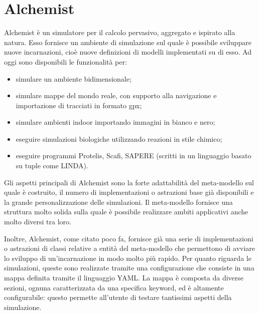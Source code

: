 \section{Alchemist}
Alchemist è un simulatore per il calcolo pervasivo, aggregato e ispirato alla natura. Esso fornisce un ambiente di simulazione sul quale è possibile sviluppare nuove incarnazioni, cioè nuove definizioni di modelli implementati su di esso. Ad oggi sono disponibili le funzionalità per:
\begin{itemize}
\item simulare un ambiente bidimensionale;
\item simulare mappe del mondo reale, con supporto alla navigazione e importazione di tracciati in formato gpx;
\item simulare ambienti indoor importando immagini in bianco e nero;
\item eseguire simulazioni biologiche utilizzando reazioni in stile chimico;
\item eseguire programmi Protelis, Scafi, SAPERE (scritti in un linguaggio basato su tuple come LINDA).
\end{itemize}

Gli aspetti principali di Alchemist sono la forte adattabilità del meta-modello sul quale è costruito, il numero di implementazioni o astrazioni base già disponibili e la grande personalizzazione delle simulazioni.
Il meta-modello fornisce una struttura molto solida sulla quale è possibile realizzare ambiti applicativi anche molto diversi tra loro.

Inoltre, Alchemist, come citato poco fa, fornisce già una serie di implementazioni o astrazioni di classi relative a entità del meta-modello che permettono di avviare lo sviluppo di un'incarnazione in modo molto più rapido.
Per quanto riguarda le simulazioni, queste sono realizzate tramite una configurazione che consiste in una mappa definita tramite il linguaggio YAML. La mappa è composta da diverse sezioni, ognuna caratterizzata da una specifica keyword, ed è altamente configurabile: questo permette all'utente di testare tantissimi aspetti della simulazione.

